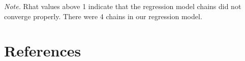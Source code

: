\documentclass[]{elsarticle} %
\begin{document}
\begin{table}[hbt!]
\begin{center}
\begin{threeparttable}
{}

\begin{tablenotes}[para]
\normalsize{\textit{Note.} Rhat values above 1 indicate that the regression model chains did not converge properly. There were 4 chains in our regression model.}
\end{tablenotes}

\end{threeparttable}
\end{center}

\end{table}

\clearpage

\hypertarget{references}{%
\section*{References}\label{references}}
\end{document}
